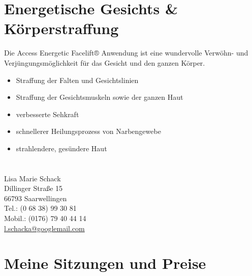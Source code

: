 \documentclass[10pt,foldmark,notumble]{leaflet}
\begin{document}
\newpage
\vspace*{20mm}
\section{Energetische Gesichts \& Körperstraffung}
Die Access Energetic Facelift® Anwendung ist eine wundervolle Verwöhn- und Verjüngungsmöglichkeit für das Gesicht und den ganzen Körper.

\begin{itemize}
\item Straffung der Falten und Gesichtslinien
\item Straffung der Gesichtsmuskeln sowie der ganzen Haut
\item verbesserte Sehkraft
\item schnellerer Heilungsprozess von Narbengewebe
\item strahlendere, gesündere Haut
\end{itemize}



\vspace*{50mm}
\section{}%
Lisa Marie Schack\\
Dillinger Straße 15\\
66793 Saarwellingen\\
Tel.: (0 68 38) 99 30 81\\
Mobil.: (0176) 79 40 44 14\\
\href{mailto:l.schacka@googlemail.com}{l.schacka@googlemail.com} \\


\newpage
\vspace*{20mm}
\section{Meine Sitzungen und Preise}
\end{document}
